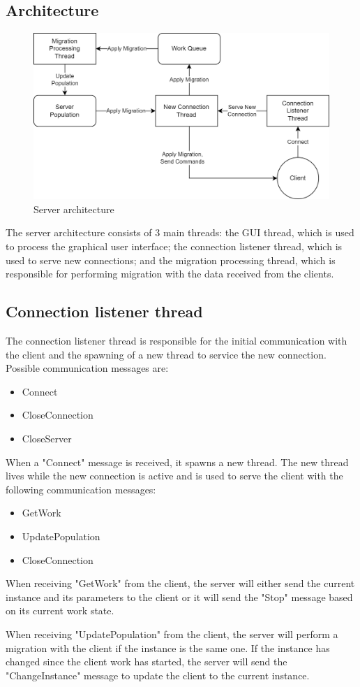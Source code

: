 \subsection{Architecture}
\begin{figure}[ht]
\includegraphics[width=\textwidth]{images/server_architecture.png}
\caption{Server architecture}
\end{figure}
The server architecture consists of 3 main threads: the GUI thread, which is used to process the graphical user interface; the connection listener thread, which is used to serve new connections; and the migration processing thread, which is responsible for performing migration with the data received from the clients.
\subsection{Connection listener thread}
The connection listener thread is responsible for the initial communication with the client and the spawning of a new thread to service the new connection.
\newline
Possible communication messages are:
\begin{itemize}
  \item Connect
  \item CloseConnection
  \item CloseServer
\end{itemize}
\newpage
When a "Connect" message is received, it spawns a new thread. The new thread lives while the new connection is active and is used to serve the client with the following communication messages:
\begin{itemize}
  \item GetWork
  \item UpdatePopulation
  \item CloseConnection
\end{itemize}
\par
When receiving "GetWork" from the client, the server will either send the current instance and its parameters to the client or it will send the "Stop" message based on its current work state.
\par
When receiving "UpdatePopulation" from the client, the server will perform a migration with the client if the instance is the same one. If the instance has changed since the client work has started, the server will send the "ChangeInstance" message to update the client to the current instance.
